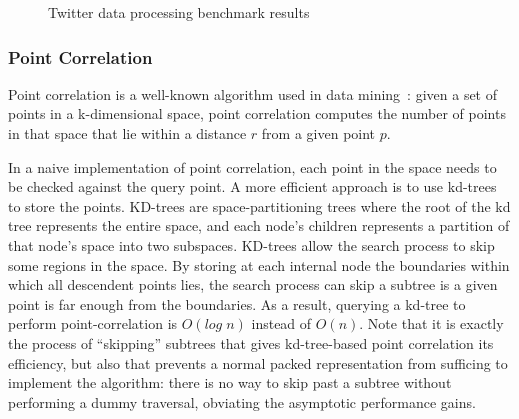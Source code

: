 \documentclass[showabstract,showacknowledgments,showpreface,showdedication]{iuphd}
\theoremstyle{nonumberplain}
\begin{document}
\begin{figure}
  \centering
  
  \caption{Twitter data processing benchmark results}
  \label{fig:twitter_slowdown_plot}
\end{figure}

\subsubsection{Point Correlation}

Point correlation  is a well-known algorithm used in data mining~\cite{gray2000n}:
given a set of points in a k-dimensional space, point correlation computes the number of points in that space  that lie within a
distance $r$ from a given point $p$. 




In a naive implementation of point correlation, each point in the space needs
to be checked against the query point. 
A more efficient approach is to use kd-trees~\cite{bentley75} to store the
points. KD-trees are space-partitioning trees where the root of the kd tree represents the entire space, and each node's children represents a partition of that node's space into two subspaces.
KD-trees allow the search
process to skip some regions in the space. By storing at each internal node
the boundaries within which all descendent points lies, the search process can
skip a subtree is a given point is far enough from the boundaries. As a
result, querying a kd-tree to perform point-correlation is $O(log\; n)$ instead
of $O(n)$. Note that it is exactly the process of ``skipping'' subtrees that
gives kd-tree-based point correlation its efficiency, but also that prevents a
normal packed representation from sufficing to implement the algorithm: there
is no way to skip past a subtree without performing a dummy traversal,
obviating the asymptotic performance gains.
\end{document}
